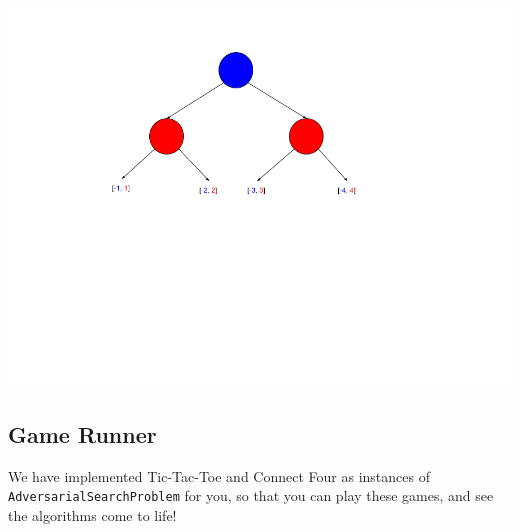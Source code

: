 \documentclass{article}
\begin{document}
\centerline{\includegraphics[scale = 0.33]{example-DAG.png}}


\mbox{}
\vspace{-1.75in}

\subsection{Game Runner}\label{gamerunner}
We have implemented Tic-Tac-Toe and Connect Four as instances of \verb|AdversarialSearchProblem| for you,
so that you can play these games, and see the algorithms come to life!
\end{document}
